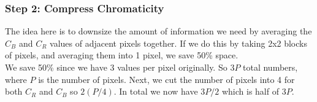 \documentclass[12pt]{article}
\theoremstyle{definition}
\begin{document}
\subsubsection{Step 2: Compress Chromaticity}
The idea here is to downsize the amount of information we need by averaging the $C_B$ and $C_R$ values of adjacent pixels together. If we do this by taking 2x2 blocks of pixels, and averaging them into 1 pixel, we save 50\% space.
\\ \linebreak
We save 50\% since we have 3 values per pixel originally. So $3P$ total numbers, where $P$ is the number of pixels. Next, we cut the number of pixels into 4 for both $C_R$ and $C_B$ so $2(P/4)$. In total we now have $3P/2$ which is half of $3P$.
\\ \linebreak
\end{document}

